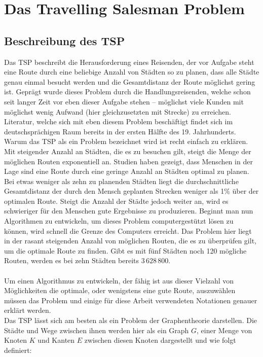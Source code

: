 \chapter{Das Travelling Salesman Problem}
\section{Beschreibung des \ac{TSP}}
Das \ac{TSP} beschreibt die Herausforderung eines Reisenden, der vor Aufgabe steht eine Route durch eine beliebige Anzahl von Städten so zu planen, dass alle Städte genau einmal besucht werden und die Gesamtdistanz der Route möglichst gering ist.
Geprägt wurde dieses Problem durch die Handlungsreisenden, welche schon seit langer Zeit vor eben dieser Aufgabe stehen -- möglichst viele Kunden mit möglichst wenig Aufwand (hier gleichzusetzten mit Strecke) zu erreichen.
Literatur, welche sich mit eben diesem Problem beschäftigt findet sich im deutschsprächigen Raum bereits in der ersten Hälfte des 19. Jahrhunderts. \autocite[siehe Abb. 1.1, S. 3]{Applegate.2006}
Warum das \ac{TSP} als ein Problem bezeichnet wird ist recht einfach zu erklären.
Mit steigender Anzahl an Städten, die es zu besuchen gilt, steigt die Menge der möglichen Routen exponentiell an.
Studien haben gezeigt, dass Menschen in der Lage sind eine Route durch eine geringe Anzahl an Städten optimal zu planen.
Bei etwas weniger als zehn zu planenden Städten liegt die durchschnittliche Gesamtdistanz der durch den Mensch geplanten Strecken weniger als 1\% über der optimalen Route. \autocite[530]{Macgregor.1996}
Steigt die Anzahl der Städte jedoch weiter an, wird es schwieriger für den Menschen gute Ergebnisse zu produzieren.
Beginnt man nun Algorithmen zu entwickeln, um dieses Problem computergestützt lösen zu können, wird schnell die Grenze des Computers erreicht.
Das Problem hier liegt in der rasant steigenden Anzahl von möglichen Routen, die es zu überprüfen gilt, um die optimale Route zu finden.
Gibt es mit fünf Städten noch 120 mögliche Routen, werden es bei zehn Städten bereits $3\,628\,800$.
\\\\
Um einen Algorithmus zu entwickeln, der fähig ist aus dieser Vielzahl von Möglichkeiten die optimale, oder wenigstens eine gute Route, auszuwählen müssen das Problem und einige für diese Arbeit verwendeten Notationen genauer erklärt werden. 
\\
Das \ac{TSP} lässt sich am besten als ein Problem der Graphentheorie darstellen.
Die Städte und Wege zwischen ihnen werden hier als ein Graph $G$, einer Menge von Knoten $K$ und Kanten $E$ zwischen diesen Knoten dargestellt und wie folgt definiert: \autocite[S. 71ff.]{Domschke.2015}
